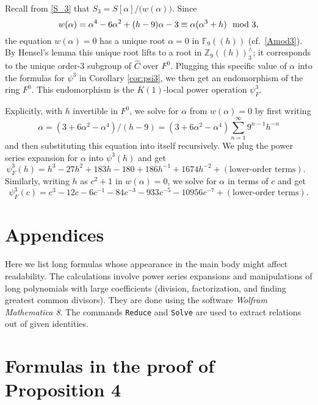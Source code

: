 \documentclass{gtpart}
\theoremstyle{definition}
\theoremstyle{remark}
\newcommand{\mb}[1]{\mathbb{#1}}
\newcommand{\BF}{{\mb F}}
\newcommand{\BZ}{{\mb Z}}
\newcommand{\HC}{\widehat{C}}
\newcommand{\md}{~~{\rm mod}~}
\newcommand{\A}{\alpha}
\newcommand{\p}{\psi^3}
\begin{document}
Recall from \eqref{S_3} that $S_3 = S[\A] \big/ \big( w(\A) \big)$.  
Since 
\[
 w(\A) = \A^4 - 6 \A^2 + (h - 9) \A - 3 \equiv \A (\A^3 + h) \md 3, 
\]
the equation $w(\A) = 0$ has a unique root $\A = 0$ in $\BF_9 (\!(h)\!)$ 
(cf.~\eqref{Amod3}).  By Hensel's lemma this unique root lifts to a root 
in $\BZ_9 (\!(h)\!)_3^\wedge$; it corresponds to the unique order-3 
subgroup of $\HC$ over $F^0$.  Plugging this specific value of $\A$ into 
the formulas for $\p$ in Corollary \ref{cor:psi3}, we then get an 
endomorphism of the ring $F^0$.  This endomorphism is the $K(1)$-local 
power operation $\psi_F^3$.  

Explicitly, with $h$ invertible in $F^0$, we solve for $\A$ from 
$w(\A) = 0$ by first writing 
\[
 \A = (3 + 6 \A^2 - \A^4) / (h - 9) = (3 + 6 \A^2 - \A^4) \sum_{n = 1}^\infty 9^{n-1} h^{-n} 
\]
and then substituting this equation into itself recursively.  We plug 
the power series expansion for $\A$ into $\p(h)$ and get 
\[
 \psi_F^3(h) = h^3 - 27 h^2 + 183 h - 180 + 186 h^{-1} + 1674 h^{-2} + (\text{lower-order terms}).  ~~~
\]
Similarly, writing $h$ as $c^2 + 1$ in $w(\A) = 0$, we solve for $\A$ in 
terms of $c$ and get 
\[
 \psi_F^3(c) = c^3 - 12 c - 6 c^{-1} - 84 c^{-3} - 933 c^{-5} - 10956 c^{-7} + (\text{lower-order terms}).  
\]


\appendix
\section*{Appendices}

Here we list long formulas whose appearance in the main body might 
affect readability.  The calculations involve power series expansions 
and manipulations of long polynomials with large coefficients (division, 
factorization, and finding greatest common divisors).  They are done 
using the software {\em Wolfram Mathematica 8}.  The commands 
\texttt{Reduce} and \texttt{Solve} are used to extract relations out of 
given identities.  


\section{Formulas in the proof of Proposition 4}
\label{apx:tors}
\end{document}
